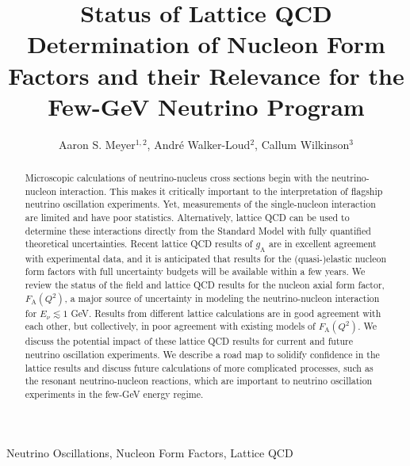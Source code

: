 \documentclass{ar-1col}
\newcommand{\change}[1]{{\color{red} #1}}
\def\asm#1{{\color{blue}#1}}
\def\del#1{}
\begin{document}

\title{Status of Lattice QCD Determination of Nucleon Form Factors
 and their Relevance for the Few-GeV Neutrino Program}

\author{Aaron S. Meyer$^{1,2}$,
Andr\'{e} Walker-Loud$^2$,
Callum Wilkinson$^3$
}

\begin{abstract}
Microscopic calculations of neutrino-nucleus cross sections begin with the neutrino-nucleon interaction\del{, making it}\asm{. This makes it} critically important to the interpretation of \del{neutrino-nucleus experiments, including }flagship \del{efforts to probe }neutrino oscillation\del{s} \asm{experiments}.
Yet, measurements of the single-nucleon interaction are limited and \asm{have}\del{of} poor statistics.
Alternatively, lattice QCD can be used to determine these interactions directly from the Standard Model with fully quantified theoretical uncertainties.
Recent lattice QCD results of $g_{\mathrm{A}}$ are in excellent agreement with experimental data,
and it is anticipated that results for the (quasi-)elastic nucleon form factors with full uncertainty budgets will be available within a \change{few} years.
We review the status of the field and lattice QCD results for the nucleon axial form factor, $F_{\mathrm{A}}(Q^2)$, a major source of uncertainty in modeling the neutrino-nucleon interaction for $E_{\nu} \lesssim 1$ GeV.
Results from different lattice calculations are in good agreement with each other, but collectively, in poor agreement with existing models of $F_{\mathrm{A}}(Q^2)$.
We discuss the potential impact of these lattice QCD results for current and future neutrino oscillation experiments.
We describe a road map to solidify confidence in the lattice results and discuss future calculations of more complicated processes, such as the resonant neutrino-nucleon reactions, which are important
to neutrino oscillation experiments in the few-GeV energy regime.
\end{abstract}

\begin{keywords}
Neutrino Oscillations, Nucleon Form Factors, Lattice QCD
\end{keywords}
\end{document}
